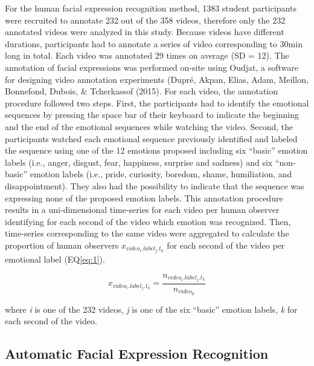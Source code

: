 \documentclass[man]{apa6}
\begin{document}
For the human facial expression recognition method, 1383 student participants were recruited to annotate 232 out of the 358 videos, therefore only the 232 annotated videos were analyzed in this study. Because videos have different durations, participants had to annotate a series of video corresponding to 30min long in total. Each video was annotated 29 times on average (SD = 12).
The annotation of facial expressions was performed on-site using Oudjat, a software for designing video annotation experiments (Dupré, Akpan, Elias, Adam, Meillon, Bonnefond, Dubois, \& Tcherkassof (2015). For each video, the annotation procedure followed two steps. First, the participants had to identify the emotional sequences by pressing the space bar of their keyboard to indicate the beginning and the end of the emotional sequences while watching the video. Second, the participants watched each emotional sequence previously identified and labeled the sequence using one of the 12 emotions proposed including six \enquote{basic} emotion labels (i.e., anger, disgust, fear, happiness, surprise and sadness) and six \enquote{non-basic} emotion labels (i.e., pride, curiosity, boredom, shame, humiliation, and disappointment). They also had the possibility to indicate that the sequence was expressing none of the proposed emotion labels.
This annotation procedure results in a uni-dimensional time-series for each video per human observer identifying for each second of the video which emotion was recognized. Then, time-series corresponding to the same video were aggregated to calculate the proportion of human observers \(x_{video_{i}.label_{j}.t_{k}}\) for each second of the video per emotional label (EQ\ref{eq:1}).

\begin{equation}
\label{eq:1}
x_{video_{i}.label_{j}.t_{k}} = \frac{n_{video_{i}.label_{j}.t_{k}}}{n_{video_{k}}}
\end{equation}

where \emph{i} is one of the 232 videos, \emph{j} is one of the six \enquote{basic} emotion labels, \emph{k} for each second of the video.

\hypertarget{automatic-facial-expression-recognition}{%
\subsection{Automatic Facial Expression Recognition}\label{automatic-facial-expression-recognition}}
\end{document}

